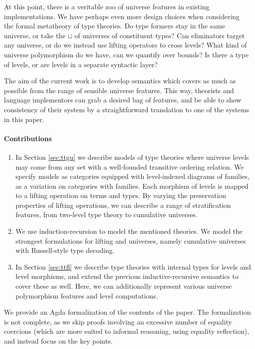 \documentclass[a4paper,UKenglish,cleveref, autoref, thm-restate]{lipics-v2021}
\theoremstyle{remark}
\theoremstyle{definition}
\begin{document}
\noindent At this point, there is a veritable zoo of universe features in existing
implementations. We have perhaps even more design choices when considering the
formal metatheory of type theories. Do type formers stay in the same
universe, or take the $\sqcup$ of universes of constituent types? Can
eliminators target any universe, or do we instead use lifting operators to cross
levels? What kind of universe polymorphism do we have, can we quantify over
bounds? Is there a type of levels, or are levels in a separate syntactic layer?

The aim of the current work is to develop semantics which covers as much as
possible from the range of sensible universe features. This way, theorists and
language implementors can grab a desired bag of features, and be able to show
consistency of their system by a straightforward translation to one of the
systems in this paper.

\paragraph*{Contributions}

\begin{enumerate}
\item In Section \ref{sec:ttgu} we describe models of type theories where
  universe levels may come from any set with a well-founded transitive ordering
  relation. We specify models as categories equipped with level-indexed diagrams
  of families, as a variation on categories with families. Each morphism of
  levels is mapped to a lifting operation on terms and types. By varying the
  preservation properties of lifting operations, we can describe a range of
  stratification features, from two-level type theory to cumulative universes.
\item We use induction-recursion to model the mentioned theories. We model
  the strongest formulations for lifting and universes, namely cumulative
  universes with Russell-style type decoding.
\item In Section \ref{sec:ttfl} we describe type theories with internal types
  for levels and level morphisms, and extend the previous inductive-recursive
  semantics to cover these as well. Here, we can additionally represent various
  universe polymorphism features and level computations.
\end{enumerate}

We provide an Agda formalization of the contents of the paper. The formalization
is not complete, as we skip proofs involving an excessive number of equality
coercions (which are more suited to informal reasoning, using equality
reflection), and instead focus on the key points.
\end{document}
